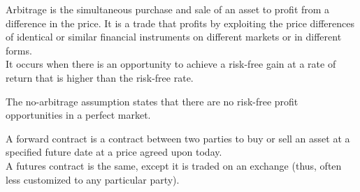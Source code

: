 \begin{definition}
    [Arbitrage]
    Arbitrage is the simultaneous purchase and sale of an asset to profit from a difference in the price. It is a trade that profits by exploiting the price differences of identical or similar financial instruments on different markets or in different forms.\\

    It occurs when there is an opportunity to achieve a risk-free gain at a rate of return that is higher than the risk-free rate.\\
\end{definition}

\begin{definition}
    The no-arbitrage assumption states that there are no risk-free profit opportunities in a perfect market.\\
\end{definition}


\begin{definition}
    A forward contract is a contract between two parties to buy or sell an asset at a specified future date at a price agreed upon today.\\

    A futures contract is the same, except it is traded on an exchange (thus, often less customized to any particular party).\\
\end{definition}

